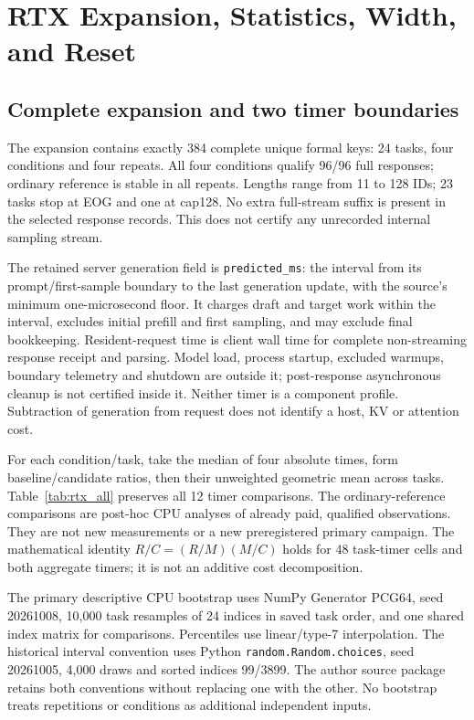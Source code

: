 \section{RTX Expansion, Statistics, Width, and Reset}
\label{supp:rtx_cost}
\subsection{Complete expansion and two timer boundaries}
\label{supp:rtx_expansion}
The expansion contains exactly 384 complete unique formal keys: 24 tasks, four conditions and four repeats. All four conditions qualify 96/96 full responses; ordinary reference is stable in all repeats. Lengths range from 11 to 128 IDs; 23 tasks stop at EOG and one at cap128. No extra full-stream suffix is present in the selected response records. This does not certify any unrecorded internal sampling stream.

The retained server generation field is \texttt{predicted\_ms}: the interval from its prompt/first-sample boundary to the last generation update, with the source's minimum one-microsecond floor. It charges draft and target work within the interval, excludes initial prefill and first sampling, and may exclude final bookkeeping. Resident-request time is client wall time for complete non-streaming response receipt and parsing. Model load, process startup, excluded warmups, boundary telemetry and shutdown are outside it; post-response asynchronous cleanup is not certified inside it. Neither timer is a component profile. Subtraction of generation from request does not identify a host, KV or attention cost.

For each condition/task, take the median of four absolute times, form baseline/candidate ratios, then their unweighted geometric mean across tasks. Table~\ref{tab:rtx_all} preserves all 12 timer comparisons. The ordinary-reference comparisons are post-hoc CPU analyses of already paid, qualified observations. They are not new measurements or a new preregistered primary campaign. The mathematical identity $R/C=(R/M)(M/C)$ holds for 48 task-timer cells and both aggregate timers; it is not an additive cost decomposition.



The primary descriptive CPU bootstrap uses NumPy Generator PCG64, seed 20261008, 10,000 task resamples of 24 indices in saved task order, and one shared index matrix for comparisons. Percentiles use linear/type-7 interpolation. The historical interval convention uses Python \texttt{random.Random.choices}, seed 20261005, 4,000 draws and sorted indices 99/3899. The author source package retains both conventions without replacing one with the other. No bootstrap treats repetitions or conditions as additional independent inputs.

